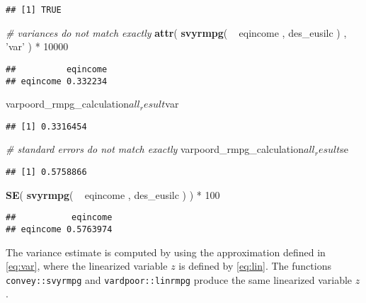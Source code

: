 \documentclass[]{book}
\newenvironment{Shaded}{\begin{snugshade}}{\end{snugshade}}
\newcommand{\KeywordTok}[1]{\textcolor[rgb]{0.13,0.29,0.53}{\textbf{{#1}}}}
\newcommand{\DecValTok}[1]{\textcolor[rgb]{0.00,0.00,0.81}{{#1}}}
\newcommand{\StringTok}[1]{\textcolor[rgb]{0.31,0.60,0.02}{{#1}}}
\newcommand{\CommentTok}[1]{\textcolor[rgb]{0.56,0.35,0.01}{\textit{{#1}}}}
\newcommand{\NormalTok}[1]{{#1}}
\begin{document}
\begin{verbatim}
## [1] TRUE
\end{verbatim}

\begin{Shaded}
\begin{Highlighting}[]
\CommentTok{# variances do not match exactly}
\KeywordTok{attr}\NormalTok{( }\KeywordTok{svyrmpg}\NormalTok{( ~}\StringTok{ }\NormalTok{eqincome , des_eusilc ) , }\StringTok{'var'} \NormalTok{) *}\StringTok{ }\DecValTok{10000}
\end{Highlighting}
\end{Shaded}

\begin{verbatim}
##          eqincome
## eqincome 0.332234
\end{verbatim}

\begin{Shaded}
\begin{Highlighting}[]
\NormalTok{varpoord_rmpg_calculation$all_result$var}
\end{Highlighting}
\end{Shaded}

\begin{verbatim}
## [1] 0.3316454
\end{verbatim}

\begin{Shaded}
\begin{Highlighting}[]
\CommentTok{# standard errors do not match exactly}
\NormalTok{varpoord_rmpg_calculation$all_result$se}
\end{Highlighting}
\end{Shaded}

\begin{verbatim}
## [1] 0.5758866
\end{verbatim}

\begin{Shaded}
\begin{Highlighting}[]
\KeywordTok{SE}\NormalTok{( }\KeywordTok{svyrmpg}\NormalTok{( ~}\StringTok{ }\NormalTok{eqincome , des_eusilc ) ) *}\StringTok{ }\DecValTok{100}
\end{Highlighting}
\end{Shaded}

\begin{verbatim}
##           eqincome
## eqincome 0.5763974
\end{verbatim}

The variance estimate is computed by using the approximation defined in
\eqref{eq:var}, where the linearized variable \(z\) is defined by
\eqref{eq:lin}. The functions \texttt{convey::svyrmpg} and
\texttt{vardpoor::linrmpg} produce the same linearized variable \(z\).
\end{document}
